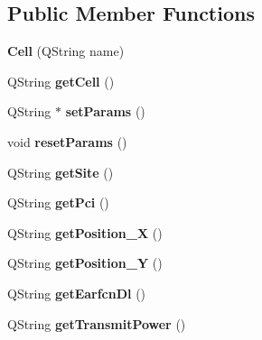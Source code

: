 \subsection*{Public Member Functions}
\begin{DoxyCompactItemize}
\item 
{\bfseries Cell} (Q\+String name)\hypertarget{class_cell_a57a2719802c1d23a436ead5ef523264e}{}\label{class_cell_a57a2719802c1d23a436ead5ef523264e}

\item 
Q\+String {\bfseries get\+Cell} ()\hypertarget{class_cell_a7f437e258bd5266d70a01ea2cdf02519}{}\label{class_cell_a7f437e258bd5266d70a01ea2cdf02519}

\item 
Q\+String $\ast$ {\bfseries set\+Params} ()\hypertarget{class_cell_a5124835d0544eea46e8dcfa51fff6e7a}{}\label{class_cell_a5124835d0544eea46e8dcfa51fff6e7a}

\item 
void {\bfseries reset\+Params} ()\hypertarget{class_cell_ad66d2f6034625a2d29f2fb744b0d83aa}{}\label{class_cell_ad66d2f6034625a2d29f2fb744b0d83aa}

\item 
Q\+String {\bfseries get\+Site} ()\hypertarget{class_cell_ac87ee0a1d55763294d14a851d1551124}{}\label{class_cell_ac87ee0a1d55763294d14a851d1551124}

\item 
Q\+String {\bfseries get\+Pci} ()\hypertarget{class_cell_a08e25d5b5b7a6e3af8ab86696436db7a}{}\label{class_cell_a08e25d5b5b7a6e3af8ab86696436db7a}

\item 
Q\+String {\bfseries get\+Position\+\_\+X} ()\hypertarget{class_cell_a78bce141440cc17cc24d4ea639de3dde}{}\label{class_cell_a78bce141440cc17cc24d4ea639de3dde}

\item 
Q\+String {\bfseries get\+Position\+\_\+Y} ()\hypertarget{class_cell_a0f076c847f83c65b01d7973fa779abf5}{}\label{class_cell_a0f076c847f83c65b01d7973fa779abf5}

\item 
Q\+String {\bfseries get\+Earfcn\+Dl} ()\hypertarget{class_cell_a737599f87a3465371ec25bcc0dcc92a4}{}\label{class_cell_a737599f87a3465371ec25bcc0dcc92a4}

\item 
Q\+String {\bfseries get\+Transmit\+Power} ()\hypertarget{class_cell_ac74525d102eafcf0da04c746d70ddb1b}{}\label{class_cell_ac74525d102eafcf0da04c746d70ddb1b}


\end{DoxyCompactItemize}
